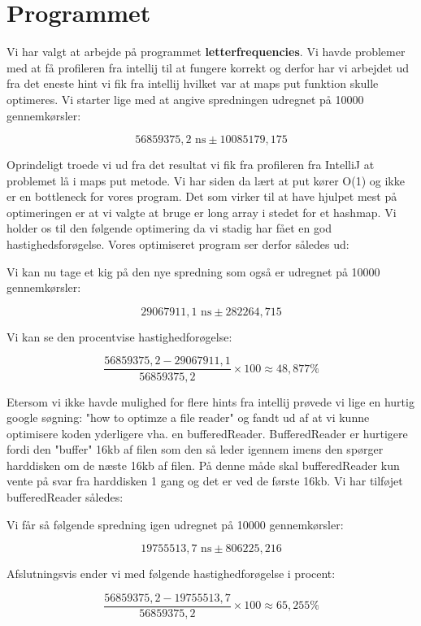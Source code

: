 \documentclass[class=report, crop=false]{standalone}
\begin{document}
    \section{Programmet}
    Vi har valgt at arbejde på programmet \textbf{letterfrequencies}. Vi havde problemer med at få profileren fra intellij til at fungere korrekt og derfor har vi arbejdet ud fra det eneste hint vi fik fra intellij hvilket var at maps put funktion skulle optimeres.
    Vi starter lige med at angive spredningen udregnet på 10000 gennemkørsler:
    \begin{tcolorbox}
        \[ 56859375,2 \text{ ns} \pm 10085179,175   \]
    \end{tcolorbox}

    \noindent Oprindeligt troede vi ud fra det resultat vi fik fra profileren fra IntelliJ at problemet lå i maps put metode. Vi har siden da lært at put kører O(1) og ikke er en bottleneck for vores program. Det som virker til at have hjulpet mest på optimeringen er at vi valgte at bruge er long array i stedet for et hashmap. Vi holder os til den følgende optimering da vi stadig har fået en god hastighedsforøgelse. Vores optimiseret program ser derfor således ud:
    \lstset{style=codestyle}
    

    \noindent Vi kan nu tage et kig på den nye spredning som også er udregnet på 10000 gennemkørsler:
    \begin{tcolorbox}
        \[ 29067911,1 \text{ ns} \pm 282264,715  \]
    \end{tcolorbox}

    \noindent Vi kan se den procentvise hastighedforøgelse:
    \begin{tcolorbox}
        \[ \frac{56859375,2 - 29067911,1}{56859375,2} \times 100 \approx 48,877\% \]
    \end{tcolorbox}

    \noindent Etersom vi ikke havde mulighed for flere hints fra intellij prøvede vi lige en hurtig google søgning: "how to optimze a file reader" og fandt ud af at vi kunne optimisere koden yderligere vha. en bufferedReader. 
    BufferedReader er hurtigere fordi den "buffer" 16kb af filen som den så leder igennem imens den spørger harddisken om de næste 16kb af filen. På denne måde skal bufferedReader kun vente på svar fra harddisken 1 gang og det er ved de første 16kb. Vi har tilføjet bufferedReader således:
    \lstset{style=codestyle}
    
    
    \noindent Vi får så følgende spredning igen udregnet på 10000 gennemkørsler:
    \begin{tcolorbox}
        \[ 19755513,7 \text{ ns} \pm 806225,216  \]
    \end{tcolorbox}

    \noindent Afslutningsvis ender vi med følgende hastighedforøgelse i procent:
    \begin{tcolorbox}
        \[ \frac{56859375,2 - 19755513,7}{56859375,2} \times 100 \approx 65,255\% \]
    \end{tcolorbox}
\end{document}
